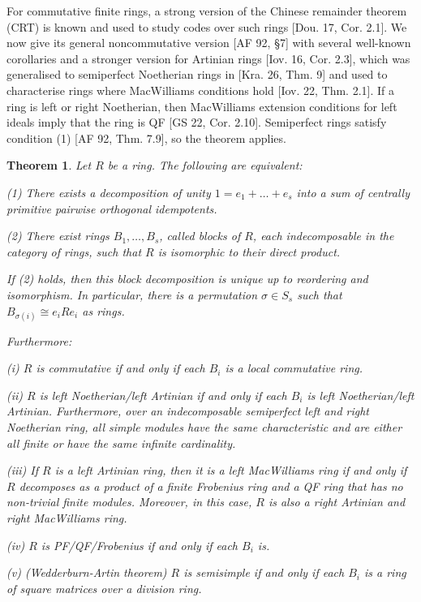 \documentclass{article}
\theoremstyle{plain}
\newtheorem{Thm}[veta]{Theorem}
\theoremstyle{plain}
\theoremstyle{remark}
\theoremstyle{plain}
\begin{document}
For commutative finite rings, a strong version of the Chinese remainder theorem (CRT) is known and used to study codes over such rings [Dou. 17, Cor. 2.1]. We now give its general noncommutative version [AF 92, §7] with several well-known corollaries and a stronger version for Artinian rings [Iov. 16, Cor. 2.3], which was generalised to semiperfect Noetherian rings in [Kra. 26, Thm. 9] and used to characterise rings where MacWilliams conditions hold [Iov. 22, Thm. 2.1]. If a ring is left or right Noetherian, then MacWilliams extension conditions for left ideals imply that the ring is QF [GS 22, Cor. 2.10]. Semiperfect rings satisfy condition (1) [AF 92, Thm. 7.9], so the theorem applies. 
\begin{Thm}\label{ThmCRT1}
    Let $R$ be a ring. The following are equivalent:

(1)  There exists a decomposition of unity $1=e_1+\dots + e_s$ into a sum of centrally primitive pairwise orthogonal idempotents.  

 (2)   There exist rings $B_1, \dots, B_s$, called \emph{blocks of $R$}, each indecomposable in the category of rings, such that $R$ is isomorphic to their direct product. 

  If (2) holds, then this \emph{block decomposition} is unique up to reordering and isomorphism. In particular, there is a permutation $\sigma\in S_s$ such that $B_{\sigma(i)}\cong e_iRe_i$ as rings. 

Furthermore: 

(i) $R$ is commutative if and only if each $B_i$ is a local commutative ring.

(ii) $R$ is left Noetherian/left Artinian if and only if each $B_i$ is left Noetherian/left Artinian. Furthermore, over an indecomposable semiperfect left and right Noetherian ring, all simple modules have the same characteristic and are either all finite or have the same infinite cardinality.

(iii)  If $R$ is a left  Artinian ring, then it is a left  MacWilliams ring
if and only if $R$ decomposes as a product of a finite Frobenius ring and a QF ring that has no non-trivial finite modules. Moreover, in this case, $R$ is also a right Artinian and right MacWilliams ring.

(iv) $R$ is PF/QF/Frobenius if and only if each $B_i$ is. 

(v) (Wedderburn-Artin theorem) $R$ is semisimple if and only if each $B_i$ is a ring of square matrices over a division ring.
\end{Thm}
\end{document}
